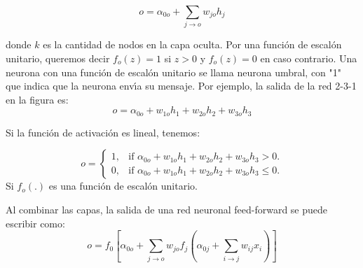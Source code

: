 	
	\begin{equation*} 
	o =  \alpha_{0o} + \sum_{j \to o} w_{jo} h_j 
	\end{equation*}
	
	donde $k$ es la cantidad de nodos en la capa oculta. Por una funci\'on  de escal\'on unitario, queremos decir $f_o(z)=1$ si $z > 0$ y $f_o(z)=0$  en caso contrario. Una neurona con una funci\'on de escal\'on unitario se llama neurona umbral, con "1" que indica que la neurona env\'{\i}a su mensaje. Por ejemplo, la salida de la red 2-3-1 en la figura es:
	\begin{equation*} 
	o = \alpha_{0o}+w_{1o} h_1+w_{2o} h_2+w_{3o} h_3
	\end{equation*}
	
	Si la funci\'on de activaci\'on es lineal, tenemos:
	
	\begin{equation*}
	o=\begin{cases}
	1, & \text{if $\alpha_{0o}+w_{1o} h_1+w_{2o} h_2+w_{3o} h_3>0$}.\\
	0, & \text{if $\alpha_{0o}+w_{1o} h_1+w_{2o} h_2+w_{3o} h_3 \leq 0$}.
	\end{cases}
	\end{equation*}
	Si  $f_o (.)$ es una funci\'on de escal\'on unitario.
	
	Al combinar las capas, la salida de una red neuronal feed-forward se puede escribir como:
	\begin{equation} \label{eq:1}
	o = f_0 \left[ \alpha_{0o} + \sum_{j \to o} w_{jo} f_j \left( \alpha_{0j} + \sum_{i \to j} w_{ij} x_i \right) \right]
	\end{equation}
	
	
